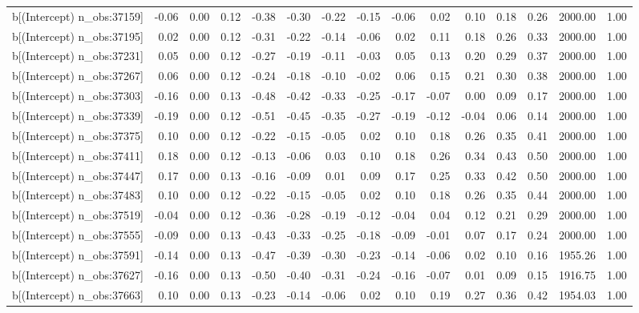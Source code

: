\begin{table}[ht]
\begin{tabular}{rrrrrrrrrrrrrrr}
  b[(Intercept) n\_obs:37159] & -0.06 & 0.00 & 0.12 & -0.38 & -0.30 & -0.22 & -0.15 & -0.06 & 0.02 & 0.10 & 0.18 & 0.26 & 2000.00 & 1.00 \\ 
  b[(Intercept) n\_obs:37195] & 0.02 & 0.00 & 0.12 & -0.31 & -0.22 & -0.14 & -0.06 & 0.02 & 0.11 & 0.18 & 0.26 & 0.33 & 2000.00 & 1.00 \\ 
  b[(Intercept) n\_obs:37231] & 0.05 & 0.00 & 0.12 & -0.27 & -0.19 & -0.11 & -0.03 & 0.05 & 0.13 & 0.20 & 0.29 & 0.37 & 2000.00 & 1.00 \\ 
  b[(Intercept) n\_obs:37267] & 0.06 & 0.00 & 0.12 & -0.24 & -0.18 & -0.10 & -0.02 & 0.06 & 0.15 & 0.21 & 0.30 & 0.38 & 2000.00 & 1.00 \\ 
  b[(Intercept) n\_obs:37303] & -0.16 & 0.00 & 0.13 & -0.48 & -0.42 & -0.33 & -0.25 & -0.17 & -0.07 & 0.00 & 0.09 & 0.17 & 2000.00 & 1.00 \\ 
  b[(Intercept) n\_obs:37339] & -0.19 & 0.00 & 0.12 & -0.51 & -0.45 & -0.35 & -0.27 & -0.19 & -0.12 & -0.04 & 0.06 & 0.14 & 2000.00 & 1.00 \\ 
  b[(Intercept) n\_obs:37375] & 0.10 & 0.00 & 0.12 & -0.22 & -0.15 & -0.05 & 0.02 & 0.10 & 0.18 & 0.26 & 0.35 & 0.41 & 2000.00 & 1.00 \\ 
  b[(Intercept) n\_obs:37411] & 0.18 & 0.00 & 0.12 & -0.13 & -0.06 & 0.03 & 0.10 & 0.18 & 0.26 & 0.34 & 0.43 & 0.50 & 2000.00 & 1.00 \\ 
  b[(Intercept) n\_obs:37447] & 0.17 & 0.00 & 0.13 & -0.16 & -0.09 & 0.01 & 0.09 & 0.17 & 0.25 & 0.33 & 0.42 & 0.50 & 2000.00 & 1.00 \\ 
  b[(Intercept) n\_obs:37483] & 0.10 & 0.00 & 0.12 & -0.22 & -0.15 & -0.05 & 0.02 & 0.10 & 0.18 & 0.26 & 0.35 & 0.44 & 2000.00 & 1.00 \\ 
  b[(Intercept) n\_obs:37519] & -0.04 & 0.00 & 0.12 & -0.36 & -0.28 & -0.19 & -0.12 & -0.04 & 0.04 & 0.12 & 0.21 & 0.29 & 2000.00 & 1.00 \\ 
  b[(Intercept) n\_obs:37555] & -0.09 & 0.00 & 0.13 & -0.43 & -0.33 & -0.25 & -0.18 & -0.09 & -0.01 & 0.07 & 0.17 & 0.24 & 2000.00 & 1.00 \\ 
  b[(Intercept) n\_obs:37591] & -0.14 & 0.00 & 0.13 & -0.47 & -0.39 & -0.30 & -0.23 & -0.14 & -0.06 & 0.02 & 0.10 & 0.16 & 1955.26 & 1.00 \\ 
  b[(Intercept) n\_obs:37627] & -0.16 & 0.00 & 0.13 & -0.50 & -0.40 & -0.31 & -0.24 & -0.16 & -0.07 & 0.01 & 0.09 & 0.15 & 1916.75 & 1.00 \\ 
  b[(Intercept) n\_obs:37663] & 0.10 & 0.00 & 0.13 & -0.23 & -0.14 & -0.06 & 0.02 & 0.10 & 0.19 & 0.27 & 0.36 & 0.42 & 1954.03 & 1.00 \\ 

\end{tabular}
\end{table}
